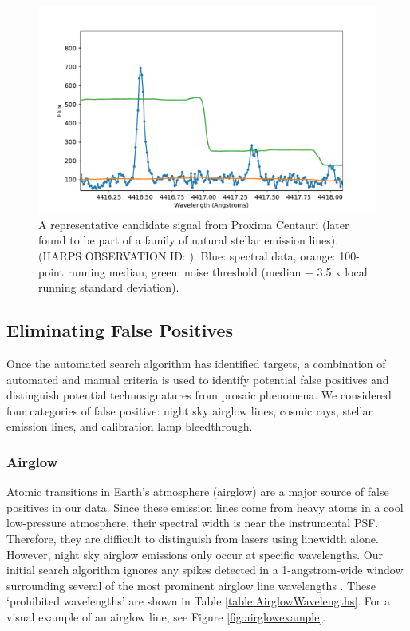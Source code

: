 \documentclass[linenumbers]{aastex631}
\begin{document}
\begin{figure}
    \centering
\includegraphics{proxima_algorithm_example4.pdf}
    \caption{A representative  candidate signal from Proxima Centauri (later found to be part of a family of natural stellar emission lines). (HARPS OBSERVATION ID: ). Blue: spectral data, orange: 100-point running median, green: noise threshold (median + 3.5 x local running standard deviation).}
    \label{fig:algorithm-example}
\end{figure}

\subsection{Eliminating False Positives}
\label{s:falsepositive}
Once the automated search algorithm has identified targets, a combination of automated and manual criteria is used to identify potential false positives and distinguish potential technosignatures from prosaic phenomena. We considered four categories of false positive: night sky airglow lines, cosmic rays, stellar emission lines, and calibration lamp bleedthrough.

\subsubsection{Airglow}
\label{s:Airglow}
Atomic transitions in Earth's atmosphere (airglow) are a major source of false positives in our data.  Since these emission lines come from heavy atoms in a cool low-pressure atmosphere, their spectral width is near the instrumental PSF. Therefore, they are difficult to distinguish from lasers using linewidth alone. However, night sky airglow emissions only occur at specific wavelengths. Our initial search algorithm ignores any spikes detected in a 1-angstrom-wide window surrounding several of the most prominent airglow line wavelengths \citep{Luger_2017}. These `prohibited wavelengths' are shown in Table \ref{table:AirglowWavelengths}. For a visual example of an airglow line, see Figure \ref{fig:airglowexample}.
\end{document}
